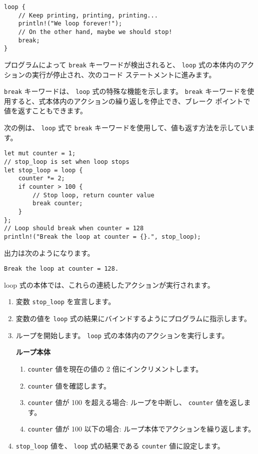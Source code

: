 \begin{lstlisting}[numbers=none]
loop {
    // Keep printing, printing, printing...
    println!("We loop forever!");
    // On the other hand, maybe we should stop!
    break;                            
}
\end{lstlisting}

プログラムによって \texttt{break} キーワードが検出されると、 \texttt{loop} 式の本体内のアクションの実行が停止され、次のコード ステートメントに進みます。

\texttt{break} キーワードは、 \texttt{loop} 式の特殊な機能を示します。 \texttt{break} キーワードを使用すると、式本体内のアクションの繰り返しを停止でき、ブレーク ポイントで値を返すこともできます。

次の例は、 \texttt{loop} 式で \texttt{break} キーワードを使用して、値も返す方法を示しています。


\begin{lstlisting}[numbers=none]
let mut counter = 1;
// stop_loop is set when loop stops
let stop_loop = loop {
    counter *= 2;
    if counter > 100 {
        // Stop loop, return counter value
        break counter;
    }
};
// Loop should break when counter = 128
println!("Break the loop at counter = {}.", stop_loop);
\end{lstlisting}

出力は次のようになります。

\begin{lstlisting}[numbers=none]
Break the loop at counter = 128.
\end{lstlisting}

loop 式の本体では、これらの連続したアクションが実行されます。

\begin{enumerate}
\item 変数 \texttt{stop\_loop} を宣言します。
\item 変数の値を \texttt{loop} 式の結果にバインドするようにプログラムに指示します。
\item ループを開始します。 \texttt{loop} 式の本体内のアクションを実行します。

\textbf{ループ本体}

\begin{enumerate}
\item \texttt{counter} 値を現在の値の 2 倍にインクリメントします。
\item \texttt{counter} 値を確認します。
\item \texttt{counter} 値が 100 を超える場合:
ループを中断し、 \texttt{counter} 値を返します。

\item \texttt{counter} 値が 100 以下の場合:
ループ本体でアクションを繰り返します。
\end{enumerate}

\item \texttt{stop\_loop} 値を、 \texttt{loop} 式の結果である \texttt{counter} 値に設定します。

\end{enumerate}


